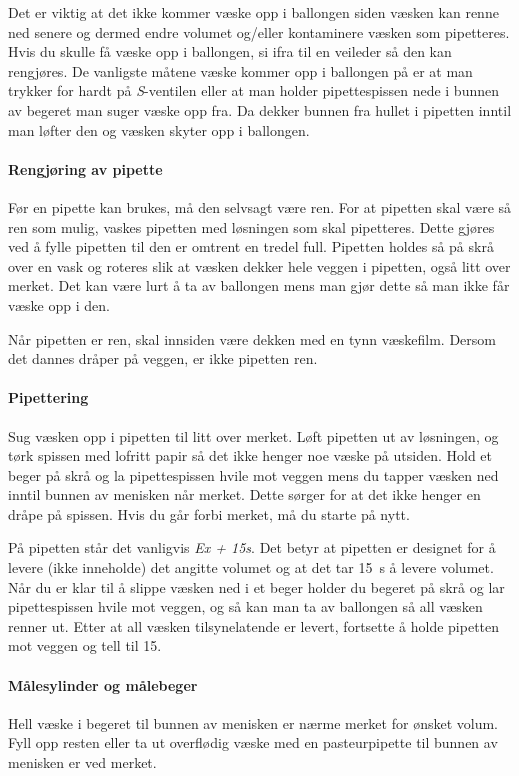 \documentclass[hidelinks,12pt,norsk,a4paper,fleqn]{scrartcl}
\begin{document}
	Det er viktig at det ikke kommer væske opp i ballongen siden væsken kan renne ned senere og dermed endre volumet og/eller kontaminere væsken som pipetteres. Hvis du skulle få væske opp i ballongen, si ifra til en veileder så den kan rengjøres. De vanligste måtene væske kommer opp i ballongen på er at man trykker for hardt på \emph{S}-ventilen eller at man holder pipettespissen nede i bunnen av begeret man suger væske opp fra. Da dekker bunnen fra hullet i pipetten inntil man løfter den og væsken skyter opp i ballongen.
	
	\paragraph{Rengjøring av pipette}
	Før en pipette kan brukes, må den selvsagt være ren. For at pipetten skal være så ren som mulig, vaskes pipetten med løsningen som skal pipetteres. Dette gjøres ved å fylle pipetten til den er omtrent en tredel full. Pipetten holdes så på skrå over en vask og roteres slik at væsken dekker hele veggen i pipetten, også litt over merket. Det kan være lurt å ta av ballongen mens man gjør dette så man ikke får væske opp i den.
	
	Når pipetten er ren, skal innsiden være dekken med en tynn væskefilm. Dersom det dannes dråper på veggen, er ikke pipetten ren.
	
	\paragraph{Pipettering}
	Sug væsken opp i pipetten til litt over merket. Løft pipetten ut av løsningen, og tørk spissen med lofritt papir så det ikke henger noe væske på utsiden. Hold et beger på skrå og la pipettespissen hvile mot veggen mens du tapper væsken ned inntil bunnen av menisken når merket. Dette sørger for at det ikke henger en dråpe på spissen. Hvis du går forbi merket, må du starte på nytt.
	
	På pipetten står det vanligvis \emph{Ex + 15s}. Det betyr at pipetten er designet for å levere (ikke inneholde) det angitte volumet og at det tar \SI{15}{s} å levere volumet. Når du er klar til å slippe væsken ned i et beger holder du begeret på skrå og lar pipettespissen hvile mot veggen, og så kan man ta av ballongen så all væsken renner ut. Etter at all væsken tilsynelatende er levert, fortsette å holde pipetten mot veggen og tell til 15. 
	
	\paragraph{Målesylinder og målebeger}
	Hell væske i begeret til bunnen av menisken er nærme merket for ønsket volum. Fyll opp resten eller ta ut overflødig væske med en pasteurpipette til bunnen av menisken er ved merket.
	
\end{document}
